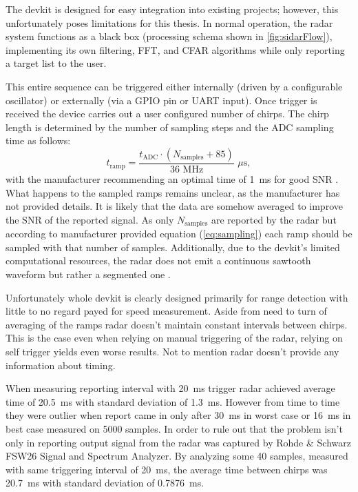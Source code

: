 The devkit is designed for easy integration into existing projects; however, this unfortunately poses limitations for this thesis.
In normal operation, the radar system functions as a black box (processing schema shown in \ref{fig:sidarFlow}), implementing its own filtering, FFT, and CFAR algorithms while only reporting a target list to the user.

This entire sequence can be triggered either internally (driven by a configurable oscillator) or externally (via a GPIO pin or UART input).
Once trigger is received the device carries out a user configured number of chirps.
The chirp length is determined by the number of sampling steps and the ADC sampling time as follows:
\begin{equation}
  t_\mathrm{ramp} = \frac{t_\mathrm{ADC} \cdot  (N_\mathrm{samples} + 85)}{36\,\, \mathrm{MHz}} \,\, \mu\mathrm{s},
  \label{eq:sampling}
\end{equation}
with the manufacturer recommending an optimal time of 1~ms for good SNR \cite{sidarPRO}.
What happens to the sampled ramps remains unclear, as the manufacturer has not provided details.
It is likely that the data are somehow averaged to improve the SNR of the reported signal.
As only $N_\mathrm{samples}$ are reported by the radar but according to manufacturer provided equation (\ref{eq:sampling}) each ramp should be sampled with that number of samples.
Additionally, due to the devkit's limited computational resources, the radar does not emit a continuous sawtooth waveform but rather a segmented one \cite{sidarPRO}.

Unfortunately whole devkit is clearly designed primarily for range detection with little to no regard payed for speed measurement.
Aside from need to turn of averaging of the ramps radar doesn't maintain constant intervals between chirps.
This is the case even when relying on manual triggering of the radar, relying on self trigger yields even worse results.
Not to mention radar doesn't provide any information about timing.

When measuring reporting interval with 20~ms trigger radar achieved average time of 20.5~ms with standard deviation of 1.3~ms.
However from time to time they were outlier when report came in only after 30~ms in worst case or 16~ms in best case measured on 5000 samples.
In order to rule out that the problem isn't only in reporting output signal from the radar was captured by Rohde \& Schwarz FSW26 Signal and Spectrum Analyzer.
By analyzing some 40 samples, measured with same triggering interval of 20~ms, the average time between chirps was 20.7~ms with standard deviation of 0.7876~ms.

